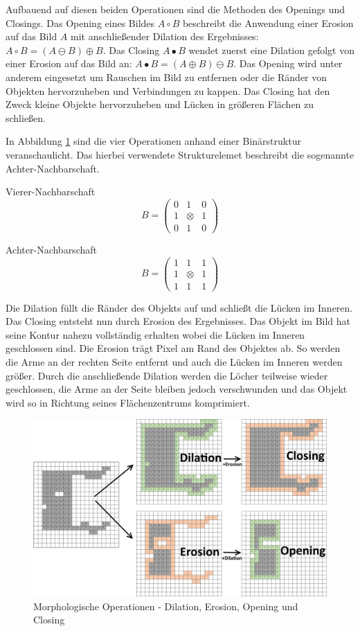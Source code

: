 Aufbauend auf diesen beiden Operationen sind die Methoden des Openings und Closings. Das Opening eines Bildes \( A \circ B\) beschreibt die Anwendung einer Erosion auf das Bild \(A\) mit anschlie\ss{}ender Dilation des Ergebnisses:  \( A \circ B = (A \ominus B) \oplus B \). Das Closing \( A \bullet B \) wendet zuerst eine Dilation gefolgt von einer Erosion auf das Bild an: \( A \bullet B = (A \oplus B) \ominus B \). Das Opening wird unter anderem eingesetzt um Rauschen im Bild zu entfernen oder die R\"ander von Objekten hervorzuheben und Verbindungen zu kappen. Das Closing hat den Zweck kleine Objekte hervorzuheben und L\"ucken in gr\"o\ss{}eren Fl\"achen zu schlie\ss{}en.

In Abbildung \ref{fig:boxfilter} sind die vier Operationen anhand einer Bin\"arstruktur veranschaulicht. Das hierbei verwendete Strukturelemet beschreibt die sogenannte Achter-Nachbarschaft.
\begin{multicols}{2}
\centering
Vierer-Nachbarschaft
\[ B = 
\begin{pmatrix}
 0 & 1 & 0 \\ 1 & \otimes & 1 \\ 0 & 1 & 0
\end{pmatrix}
\]

\columnbreak

\centering
Achter-Nachbarschaft
\[ B = 
\begin{pmatrix}
 1 & 1 & 1 \\ 1 & \otimes & 1 \\ 1 & 1 & 1
\end{pmatrix}
\]
\end{multicols}
Die Dilation f\"ullt die R\"ander des Objekts auf und schlie\ss{}t die L\"ucken im Inneren. Das Closing entsteht nun durch Erosion des Ergebnisses. Das Objekt im Bild hat seine Kontur nahezu vollst\"andig erhalten wobei die L\"ucken im Inneren geschlossen sind.
Die Erosion tr\"agt Pixel am Rand des Objektes ab. So werden die Arme an der rechten Seite entfernt und auch die L\"ucken im Inneren werden gr\"o\ss{}er. Durch die anschlie\ss{}ende Dilation werden die L\"ocher teilweise wieder geschlossen, die Arme an der Seite bleiben jedoch verschwunden und das Objekt wird so in Richtung seines Fl\"achenzentrums komprimiert.

\begin{figure}
 \centering
 \includegraphics[width=1\textwidth]{media/morph/morph_all_text.png}
 \caption{Morphologische Operationen - Dilation, Erosion, Opening und Closing}
 \label{fig:boxfilter}
\end{figure}
